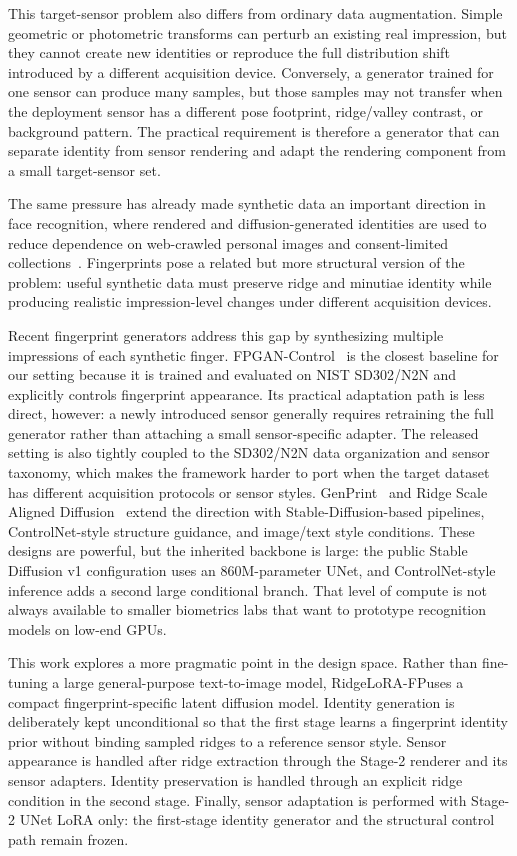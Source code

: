 \documentclass{article}
\newcommand{\method}{RidgeLoRA-FP}
\begin{document}
This target-sensor problem also differs from ordinary data augmentation.  Simple
geometric or photometric transforms can perturb an existing real impression, but
they cannot create new identities or reproduce the full distribution shift
introduced by a different acquisition device.  Conversely, a generator trained
for one sensor can produce many samples, but those samples may not transfer when
the deployment sensor has a different pose footprint, ridge/valley contrast, or
background pattern.  The practical requirement is therefore a generator that can
separate identity from sensor rendering and adapt the rendering component from a
small target-sensor set.

The same pressure has already made synthetic data an important direction in
face recognition, where rendered and diffusion-generated identities are used to
reduce dependence on web-crawled personal images and consent-limited
collections~\cite{bae2023digiface,kim2023dcface}.  Fingerprints pose a related
but more structural version of the problem: useful synthetic data must preserve
ridge and minutiae identity while producing realistic impression-level changes
under different acquisition devices.

Recent fingerprint generators address this gap by synthesizing multiple
impressions of each synthetic finger.  FPGAN-Control~\cite{shoshan2023fpgan}
is the closest baseline for our setting because it is trained and evaluated on
NIST SD302/N2N and explicitly controls fingerprint appearance.  Its practical
adaptation path is less direct, however: a newly introduced sensor generally
requires retraining the full generator rather than attaching a small
sensor-specific adapter.  The released setting is also tightly coupled to the
SD302/N2N data organization and sensor taxonomy, which makes the framework
harder to port when the target dataset has different acquisition protocols or
sensor styles.  GenPrint~\cite{grosz2024genprint} and Ridge Scale Aligned
Diffusion~\cite{hsu2026ridge} extend the direction with Stable-Diffusion-based
pipelines, ControlNet-style structure guidance, and image/text style
conditions.  These designs are powerful, but the inherited backbone is large:
the public Stable Diffusion v1 configuration uses an 860M-parameter UNet, and
ControlNet-style inference adds a second large conditional branch.  That level
of compute is not always available to smaller biometrics labs that want to
prototype recognition models on low-end GPUs.

This work explores a more pragmatic point in the design space.  Rather than
fine-tuning a large general-purpose text-to-image model, \method uses a compact
fingerprint-specific latent diffusion model.  Identity generation is deliberately
kept unconditional so that the first stage learns a fingerprint identity prior
without binding sampled ridges to a reference sensor style.  Sensor appearance
is handled after ridge extraction through the Stage-2 renderer and its sensor
adapters.  Identity preservation is handled through an explicit ridge condition
in the second stage.  Finally, sensor adaptation is performed with Stage-2 UNet
LoRA only: the first-stage identity generator and the structural control path
remain frozen.
\end{document}
